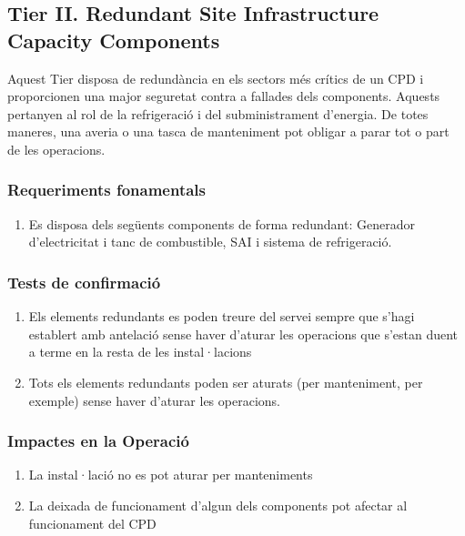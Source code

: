 \documentclass[11pt,a4paper,titlepage]{article}
\begin{document}
    
    
    \subsection{Tier II. Redundant Site Infrastructure Capacity Components}
    Aquest Tier disposa de redundància en els sectors més crítics de un CPD i proporcionen una major seguretat contra a fallades dels components. Aquests pertanyen al rol de la refrigeració i del subministrament d'energia. De totes maneres, una averia o una tasca de manteniment pot obligar a parar tot o part de les operacions.
    
    \subsubsection{Requeriments fonamentals}
    \begin{enumerate}[nolistsep, label=\alph*.]
    \item Es disposa dels següents components de forma redundant: Generador d'electricitat i tanc de combustible, SAI i sistema de refrigeració.
    \end{enumerate}
    
    \subsubsection{Tests de confirmació}
    \begin{enumerate}[nolistsep, label=\alph*.]
    \item Els elements redundants es poden treure del servei sempre que s'hagi establert amb antelació sense haver d'aturar les operacions que s'estan duent a terme en la resta de les instal·lacions
    \item Tots els elements redundants poden ser aturats (per manteniment, per exemple) sense haver d'aturar les operacions.
    \end{enumerate}
    
    \subsubsection{Impactes en la Operació}
    \begin{enumerate}[nolistsep, label=\alph*.]
    \item La instal·lació no es pot aturar per manteniments
    \item La deixada de funcionament d'algun dels components pot afectar al funcionament del CPD
    \end{enumerate}
    
\end{document}
